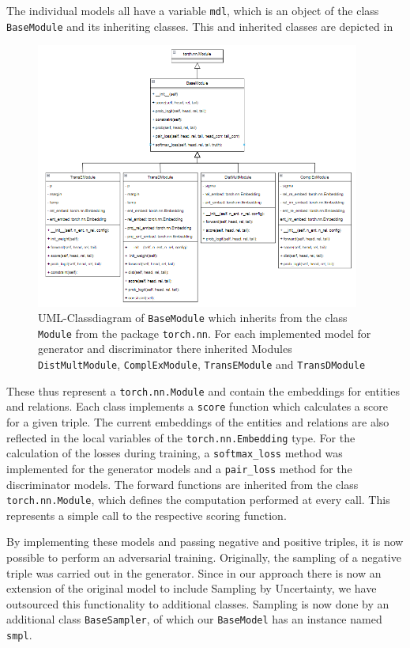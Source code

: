 The individual models all have a variable \texttt{mdl}, which is an object of the class \texttt{BaseModule} and its inheriting classes.
This and inherited classes are depicted in 
\begin{figure}[t]
  \centering
    \includegraphics[width=0.95\textwidth]{figures/BaseModule.PNG}
  \caption{\ac{UML}-Classdiagram of \texttt{BaseModule} which inherits from the class \texttt{Module} from the package \texttt{torch.nn}.
  For each implemented model for generator and discriminator there inherited Modules \texttt{DistMultModule},  \texttt{ComplExModule},  \texttt{TransEModule} and  \texttt{TransDModule}}
  \label{fig:basemodule_classdiagram}
\end{figure}
These thus represent a \texttt{torch.nn.Module} and contain the embeddings for entities and relations.
Each class implements a \texttt{score} function which calculates a score for a given triple.
The current embeddings of the entities and relations are also reflected in the local variables of the \texttt{torch.nn.Embedding} type.
For the calculation of the losses during training, a \texttt{softmax\_loss} method was implemented for the generator models and a \texttt{pair\_loss} method for the discriminator models.
The forward functions are inherited from the class \texttt{torch.nn.Module}, which defines the computation performed at every call.
This represents a simple call to the respective scoring function.

By implementing these models and passing negative and positive triples, it is now possible to perform an adversarial training.
Originally, the sampling of a negative triple was carried out in the generator.
Since in our approach there is now an extension of the original model to include Sampling by Uncertainty, we have outsourced this functionality to additional classes.
Sampling is now done by an additional class \texttt{BaseSampler}, of which our \texttt{BaseModel} has an instance named \texttt{smpl}.